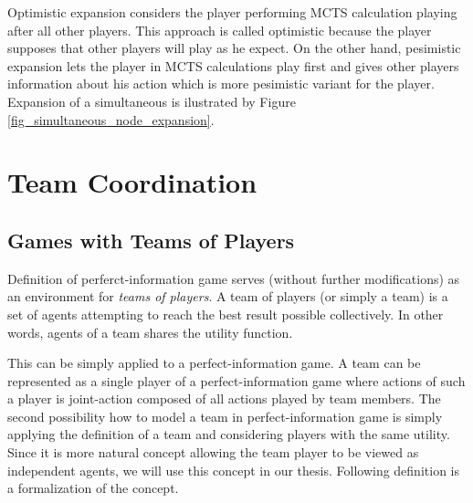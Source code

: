Optimistic expansion considers the
player performing MCTS calculation playing after all other players. This approach is called
optimistic because the player supposes that other players will play as he expect. On the other hand,
pesimistic expansion lets the player in MCTS calculations play first and gives other players
information about his action which is more pesimistic variant for the player. Expansion of
a simultaneous is ilustrated by Figure \ref{fig_simultaneous_node_expansion}.



\section{Team Coordination}

\subsection{Games with Teams of Players}
\label{sec_games_with_teams}

Definition of perferct-information game serves (without further modifications) as an
environment for \emph{teams of players}. A team of players (or simply a team) is a set of agents
attempting to reach the best result possible collectively. In other words, agents of a team
shares the utility function. 

This can be simply applied to a perfect-information game. A team can be represented as a single
player of a perfect-information game where actions of such a player is joint-action composed of
all actions played by team members. The second possibility how to model a team in
perfect-information game is simply applying the definition of a team and considering players
with the same utility. Since it is more natural concept allowing the team player to be viewed as
independent agents, we will use this concept in our thesis. Following definition is a
formalization of the concept.


